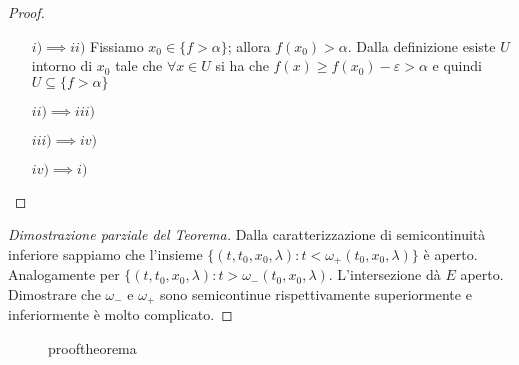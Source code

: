 \begin{proof}\( \)
\begin{itemize}
    \item[\(i) \implies ii)\)] Fissiamo \(x_{0} \in \{f>\alpha\}\); allora
        \(f(x_{0}) > \alpha\). Dalla definizione esiste \(U\) intorno di
        \(x_{0}\) tale che \(\forall x \in U\) si ha che \(f(x) \ge f(x_{0})
        -\varepsilon > \alpha\) e quindi \(U \subseteq \{f > \alpha\}\) 
    \item[\(ii) \implies iii) \)] 
    \item[\(iii) \implies iv) \)]
    \item[\(iv) \implies i)\)]
\end{itemize}
\end{proof}

\begin{proof}[Dimostrazione parziale del Teorema]
    Dalla caratterizzazione di semicontinuità inferiore sappiamo che l'insieme
    \(\{(t, t_{0},x_{0}, \lambda) : t < \omega_+{(t_{0},x_{0},\lambda)}\} \) è
    aperto. Analogamente per \(\{{(t,t_{0},x_{0},\lambda)}: t>
        \omega_-{(t_{0},x_{0},\lambda)} \). L'intersezione dà \(E\) aperto.
        Dimostrare che \(\omega_-\) e \(\omega_+\) sono semicontinue
        rispettivamente superiormente e inferiormente è molto complicato.
\end{proof}
\begin{figure}[ht]
    \centering
    \caption{prooftheorema}
    \label{fig:prooftheorema}
\end{figure}
